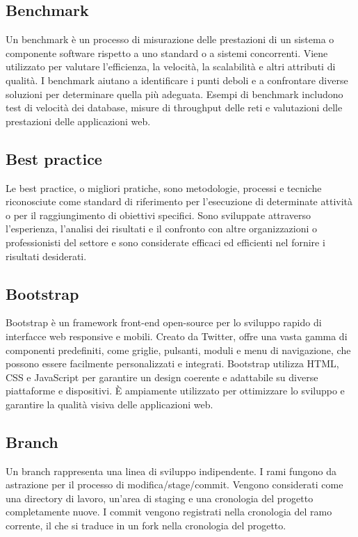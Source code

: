 \vspace{2em}
\subsection*{Benchmark}
\par Un benchmark è un processo di misurazione delle prestazioni di un sistema o componente software rispetto a uno standard o a sistemi concorrenti. Viene utilizzato per valutare l'efficienza, la velocità, la scalabilità e altri attributi di qualità. I benchmark aiutano a identificare i punti deboli e a confrontare diverse soluzioni per determinare quella più adeguata. Esempi di benchmark includono test di velocità dei database, misure di throughput delle reti e valutazioni delle prestazioni delle applicazioni web.

\vspace{2em}
\subsection*{Best practice}
\par Le best practice, o migliori pratiche, sono metodologie, processi e tecniche riconosciute come standard di riferimento per l'esecuzione di determinate attività o per il raggiungimento di obiettivi specifici. Sono sviluppate attraverso l'esperienza, l'analisi dei risultati e il confronto con altre organizzazioni o professionisti del settore e sono considerate efficaci ed efficienti nel fornire i risultati desiderati.

\vspace{2em}
\subsection*{Bootstrap}
\par Bootstrap è un framework front-end open-source per lo sviluppo rapido di interfacce web responsive e mobili. Creato da Twitter, offre una vasta gamma di componenti predefiniti, come griglie, pulsanti, moduli e menu di navigazione, che possono essere facilmente personalizzati e integrati. Bootstrap utilizza HTML, CSS e JavaScript per garantire un design coerente e adattabile su diverse piattaforme e dispositivi. È ampiamente utilizzato per ottimizzare lo sviluppo e garantire la qualità visiva delle applicazioni web.

\vspace{2em}
\subsection*{Branch}
\par Un branch rappresenta una linea di sviluppo indipendente. I rami fungono da astrazione per il processo di modifica/stage/commit. Vengono considerati come una directory di lavoro, un'area di staging e una cronologia del progetto completamente nuove. I commit vengono registrati nella cronologia del ramo corrente, il che si traduce in un fork nella cronologia del progetto.

